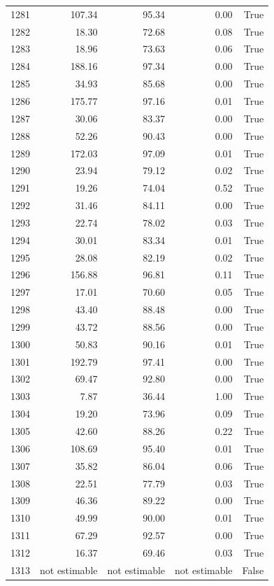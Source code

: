 \begin{longtable}{rrrrr}
1281 & 107.34 & 95.34 & 0.00 & True \\
1282 & 18.30 & 72.68 & 0.08 & True \\
1283 & 18.96 & 73.63 & 0.06 & True \\
1284 & 188.16 & 97.34 & 0.00 & True \\
1285 & 34.93 & 85.68 & 0.00 & True \\
1286 & 175.77 & 97.16 & 0.01 & True \\
1287 & 30.06 & 83.37 & 0.00 & True \\
1288 & 52.26 & 90.43 & 0.00 & True \\
1289 & 172.03 & 97.09 & 0.01 & True \\
1290 & 23.94 & 79.12 & 0.02 & True \\
1291 & 19.26 & 74.04 & 0.52 & True \\
1292 & 31.46 & 84.11 & 0.00 & True \\
1293 & 22.74 & 78.02 & 0.03 & True \\
1294 & 30.01 & 83.34 & 0.01 & True \\
1295 & 28.08 & 82.19 & 0.02 & True \\
1296 & 156.88 & 96.81 & 0.11 & True \\
1297 & 17.01 & 70.60 & 0.05 & True \\
1298 & 43.40 & 88.48 & 0.00 & True \\
1299 & 43.72 & 88.56 & 0.00 & True \\
1300 & 50.83 & 90.16 & 0.01 & True \\
1301 & 192.79 & 97.41 & 0.00 & True \\
1302 & 69.47 & 92.80 & 0.00 & True \\
1303 & 7.87 & 36.44 & 1.00 & True \\
1304 & 19.20 & 73.96 & 0.09 & True \\
1305 & 42.60 & 88.26 & 0.22 & True \\
1306 & 108.69 & 95.40 & 0.01 & True \\
1307 & 35.82 & 86.04 & 0.06 & True \\
1308 & 22.51 & 77.79 & 0.03 & True \\
1309 & 46.36 & 89.22 & 0.00 & True \\
1310 & 49.99 & 90.00 & 0.01 & True \\
1311 & 67.29 & 92.57 & 0.00 & True \\
1312 & 16.37 & 69.46 & 0.03 & True \\
1313 & not estimable & not estimable & not estimable & False \\

\end{longtable}
